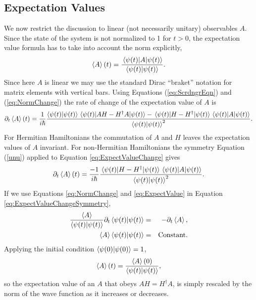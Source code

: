 \subsection{Expectation Values} %
%
%
%
%
We now restrict the discussion to linear (not necessarily unitary) observables $A$. Since the state of the system is not normalized to 1
for $t>0$, the expectation value formula has to take into account the norm explicitly,
%
\begin{equation}
  \expval{A}(t) = \frac{\ev{A}{\psi(t)}}{\braket{\psi(t)}}.
  \label{eq:ExpectValue}
\end{equation}
%
Since here $A$ is linear we may use
the standard Dirac ``braket'' notation for matrix elements with vertical bars.
Using Equations (\ref{eq:ScrdngrEqn}) and (\ref{eq:NormChange})
the rate of change of the expectation value of $A$ is
%
\begin{equation}
  \partial_t \ev{A}(t) = \frac{1}{i\hbar}\frac{\braket{\psi(t)}\ev{AH-H^\dagger A}{\psi(t)}-\ev{H-H^\dagger}{\psi(t)}\ev{A}{\psi(t)}}{\braket{\psi(t)}^2}.
  \label{eq:ExpectValueChange}
\end{equation}
%
%
%
%
%
%
For Hermitian Hamiltonians the commutation of $A$ and $H$ leaves  the expectation values of $A$ invariant.
For non-Hermitian Hamiltonians the symmetry Equation (\ref{unu})
applied to Equation \eqref{eq:ExpectValueChange} gives
%
\begin{equation}
\partial_t \ev{A}(t) = \frac{-1}{i\hbar}\frac{\ev{H-H^\dagger}{\psi(t)}\ev{A}{\psi(t)}}{\braket{\psi(t)}^2}.
\label{eq:ExpectValueChangeSymmetry}
\end{equation}
%
If we use Equations \eqref{eq:NormChange} and \eqref{eq:ExpectValue} in Equation
\eqref{eq:ExpectValueChangeSymmetry},
%
\begin{eqnarray}
\frac{\ev{A}}{\braket{\psi(t)}} \partial_t\braket{\psi(t)} &=& -  \partial_t \ev{A} ,
\\
\ev{A}\braket{\psi(t)} &=& \text{Constant}.
\end{eqnarray}
%
Applying the initial condition $\braket{\psi(0)}=1$,
%
\begin{equation}
  \ev{A}(t) = \frac{\ev{A}(0)}{\braket{\psi(t)}},
  \label{eq:ExpectValueScaling}
\end{equation}
%
so the expectation value of an $A$ that obeys
$AH = H^\dagger A$,  is simply rescaled by the norm of the wave function as it increases or decreases.
%
%

